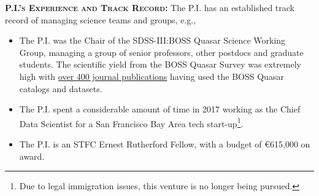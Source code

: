 \smallskip
\smallskip
\noindent
\textbf{\textsc{P.I.'s Experience and Track Record:}}
The P.I. has an established track record of managing science teams and groups, e.g., 
\begin{itemize}
  \item The P.I. was the Chair
     of the SDSS-III:BOSS Quasar Science Working Group, managing a
     group of senior professors, other postdocs and graduate students.
     The scientific yield from the BOSS Quasar Survey was extremely high 
     with \href{https://tinyurl.com/ycxd8lb6}{over 400 journal publications} having 
     used the BOSS Quasar catalogs and datasets.
 
    \item The P.I. spent a considerable amount of time in 2017 working as the
     Chief Data Scientist for a San Francisco Bay Area 
     tech start-up\footnote{Due to legal immigration issues, this venture is no longer being pursued.}. 

     \item The P.I. is an STFC Ernest Rutherford Fellow, with a budget of \euro615,000 on award. 
\end{itemize}

